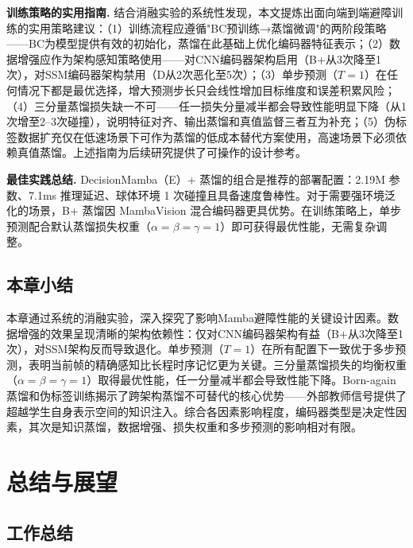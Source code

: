 \documentclass[12pt,a4paper]{article}
\makeatletter
\numberwithin{equation}{section}
\numberwithin{figure}{section}
\numberwithin{table}{section}
\newcommand{\cleardoublepage}{\clearpage\if@twoside\ifodd\c@page\else\hbox{}\thispagestyle{empty}\newpage\if@twocolumn\hbox{}\newpage\fi\fi\fi}%
\makeatother
\begin{document}
\textbf{训练策略的实用指南.} 结合消融实验的系统性发现，本文提炼出面向端到端避障训练的实用策略建议：（1）训练流程应遵循"BC预训练→蒸馏微调"的两阶段策略——BC为模型提供有效的初始化，蒸馏在此基础上优化编码器特征表示；（2）数据增强应作为架构感知策略使用——对CNN编码器架构启用（B+从3次降至1次），对SSM编码器架构禁用（D从2次恶化至5次）；（3）单步预测（$T=1$）在任何情况下都是最优选择，增大预测步长只会线性增加目标维度和误差积累风险；（4）三分量蒸馏损失缺一不可——任一损失分量减半都会导致性能明显下降（从1次增至2--3次碰撞），说明特征对齐、输出蒸馏和真值监督三者互为补充；（5）伪标签数据扩充仅在低速场景下可作为蒸馏的低成本替代方案使用，高速场景下必须依赖真值蒸馏。上述指南为后续研究提供了可操作的设计参考。

\textbf{最佳实践总结.} DecisionMamba（E）+ 蒸馏的组合是推荐的部署配置：2.19M 参数、7.1ms 推理延迟、球体环境 1 次碰撞且具备速度鲁棒性。对于需要强环境泛化的场景，B+ 蒸馏因 MambaVision 混合编码器更具优势。在训练策略上，单步预测配合默认蒸馏损失权重（$\alpha=\beta=\gamma=1$）即可获得最优性能，无需复杂调整。

\subsection{本章小结}

本章通过系统的消融实验，深入探究了影响Mamba避障性能的关键设计因素。数据增强的效果呈现清晰的架构依赖性：仅对CNN编码器架构有益（B+从3次降至1次），对SSM架构反而导致退化。单步预测（$T=1$）在所有配置下一致优于多步预测，表明当前帧的精确感知比长程时序记忆更为关键。三分量蒸馏损失的均衡权重（$\alpha=\beta=\gamma=1$）取得最优性能，任一分量减半都会导致性能下降。Born-again蒸馏和伪标签训练揭示了跨架构蒸馏不可替代的核心优势——外部教师信号提供了超越学生自身表示空间的知识注入。综合各因素影响程度，编码器类型是决定性因素，其次是知识蒸馏，数据增强、损失权重和多步预测的影响相对有限。

\cleardoublepage
\section{总结与展望}

\subsection{工作总结}
\end{document}
